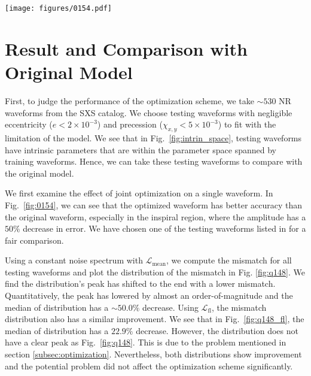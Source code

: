 \documentclass[twocolumn]{aastex631}
\begin{document}
\begin{figure*}[t]
	\centering
	\texttt{[image: figures/0154.pdf]}
	\caption{Comparison between original and optimized IMRPhenomD waveforms. Here shows the SXS:BBH:0154 NR waveform, which has mass ratio $q=1$ and $\chi_1=\chi_2=-0.8$. The original mismatch is around $2.8\times10^{-4}$ and the optimized mismatch is around $5.3\times10^{-5}$. Top: It shows the amplitude and phase of NR, original IMRPhenomD and optimized IMRPhenomD waveform. Bottom: It shows the relative error of amplitudes between NR and IMRPhenomD waveforms, and the absolute error of phases between NR and IMRPhenomD waveforms}
	\label{fig:0154}
\end{figure*}

\section{Result and Comparison with Original Model} \label{sec:result}

First, to judge the performance of the optimization scheme, we take $\sim530$ NR waveforms from the SXS catalog. We choose testing waveforms with negligible eccentricity (${e<2\times10^{-3}}$) and precession (${\chi_{x,y}<5\times10^{-3}}$) to fit with the limitation of the model. We see that in Fig.~\ref{fig:intrin_space}, testing waveforms have intrinsic parameters that are within the parameter space spanned by training waveforms. Hence, we can take these testing waveforms to compare with the original model. 

We first examine the effect of joint optimization on a single waveform. In Fig.~\ref{fig:0154}, we can see that the optimized waveform has better accuracy than the original waveform, especially in the inspiral region, where the amplitude has a $50\%$ decrease in error. We have chosen one of the testing waveforms listed in \citep{khan2016frequency} for a fair comparison. 

Using a constant noise spectrum with $\mathcal{L}_{\mathrm{mean}}$, we compute the mismatch for all testing waveforms and plot the distribution of the mismatch in Fig. \ref{fig:q148}. We find the distribution's peak has shifted to the end with a lower mismatch. Quantitatively, the peak has lowered by almost an order-of-magnitude and the median of distribution has a $\sim50.0\%$ decrease. Using $\mathcal{L}_{\mathrm{fl}}$, the mismatch distribution also has a similar improvement. We see that in Fig.~\ref{fig:q148_fl}, the median of distribution has a $22.9\%$ decrease. However, the distribution does not have a clear peak as Fig.~\ref{fig:q148}. This is due to the problem mentioned in section \ref{subsec:optimization}. Nevertheless, both distributions show improvement and the potential problem did not affect the optimization scheme significantly.  
\end{document}
